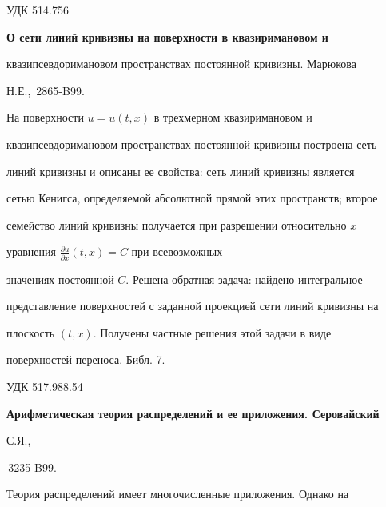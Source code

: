 \bigskip 


 


 


{\hfill {УДК 514.756}} 


 


{\bf О сети линий кривизны на поверхности в квазиримановом и 


квазипсевдоримановом пространствах постоянной кривизны. Марюкова 


Н.Е., \No\,2865-B99.} 


\medskip 


 


На поверхности $u=u(t,x)$ в трехмерном квазиримановом и 


квазипсевдоримановом пространствах постоянной кривизны построена сеть 


линий кривизны и описаны ее свойства: сеть линий кривизны является 


сетью Кенигса, определяемой абсолютной прямой этих пространств; второе 


семейство линий кривизны получается при разрешении относительно $x$ 


уравнения $\frac{\partial u}{\partial x}(t,x)=C$ при всевозможных 


значениях постоянной $C$. Решена обратная задача: найдено интегральное 


представление поверхностей с заданной проекцией сети линий кривизны на 


плоскость $(t,x)$. Получены частные решения этой задачи в виде 


поверхностей переноса. Библ. 7. 


\bigskip 


 


 


{\hfill {УДК 517.988.54}} 


 


{\bf Арифметическая теория распределений и ее приложения. Серовайский 


С.Я., 


\No\,3235-B99.} 


\medskip 





Теория распределений имеет многочисленные приложения. Однако на 


